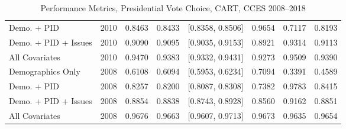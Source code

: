 \begin{table}[H]
\begin{tabular}{lrrrlrrr}
  Demo. + PID & 2010 & 0.8463 & 0.8433 & [0.8358, 0.8506] & 0.9654 & 0.7117 & 0.8193 \\ 
  Demo. + PID + Issues & 2010 & 0.9090 & 0.9095 & [0.9035, 0.9153] & 0.8921 & 0.9314 & 0.9113 \\ 
  All Covariates & 2010 & 0.9470 & 0.9383 & [0.9332, 0.9431] & 0.9273 & 0.9509 & 0.9390 \\ 
  Demographics Only & 2008 & 0.6108 & 0.6094 & [0.5953, 0.6234] & 0.7094 & 0.3391 & 0.4589 \\ 
  Demo. + PID & 2008 & 0.8257 & 0.8200 & [0.8087, 0.8308] & 0.7382 & 0.9783 & 0.8415 \\ 
  Demo. + PID + Issues & 2008 & 0.8854 & 0.8838 & [0.8743, 0.8928] & 0.8560 & 0.9162 & 0.8851 \\ 
  All Covariates & 2008 & 0.9676 & 0.9663 & [0.9607, 0.9713] & 0.9673 & 0.9635 & 0.9654 \\ 
   \bottomrule
\end{tabular}
\caption{Performance Metrics, Presidential Vote Choice, CART, CCES 2008--2018} 
\label{tab:cces_preschoice_cart}
\end{table}
